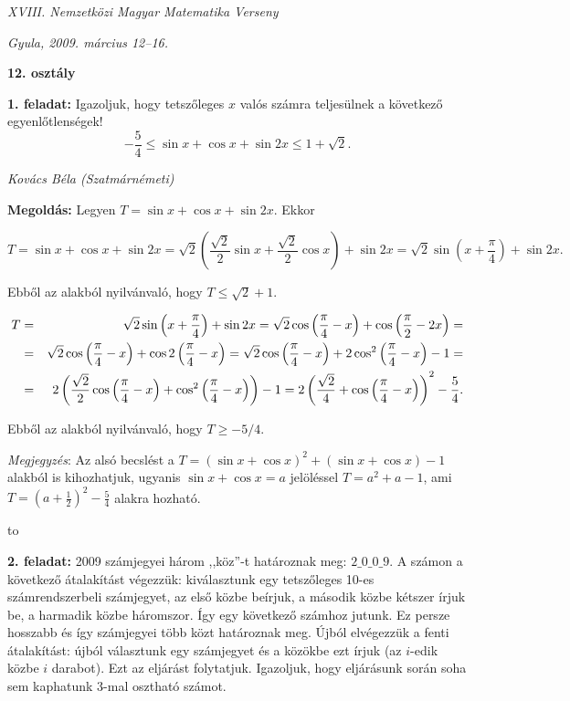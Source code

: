 \documentclass[a4paper,10pt]{article}
\newcommand{\ki}[2]{\hfill {\it #1 (#2)}\medskip}
\newcommand{\vonal}{\hbox to \hsize{\hskip2truecm\hrulefill\hskip2truecm}}
\begin{document}
\begin{center} \Large {\em XVIII. Nemzetközi Magyar Matematika Verseny} \end{center}
\begin{center} \large{\em Gyula, 2009. március 12--16. } \end{center}
\smallskip
\begin{center} \large{\bf 12. osztály} \end{center}
\bigskip 


{\bf 1. feladat:} 
Igazoljuk, hogy tetszőleges $x$ valós számra teljesülnek a következő
egyenlőtlenségek!
$$ -\frac 54\leq \sin{x}+\cos{x}+\sin{2x}\leq 1+\sqrt{2}. $$

\ki{Kovács Béla }{Szatmárnémeti}\medskip

{\bf Megoldás:} Legyen $T = \sin x + \cos x + \sin 2x$. Ekkor

$$
T=\sin x + \cos x +\sin 2x = 
\sqrt 2\left(\frac{\sqrt 2}{2}\sin x+\frac{\sqrt 2}{2}\cos x\right)+\sin 2x =
\sqrt 2 \sin\left(x+\frac{\pi}{4}\right)+\sin 2x.
$$

Ebből az alakból nyilvánvaló, hogy $T \le \sqrt 2 + 1$.

\begin{eqnarray*}
T&=& 
\sqrt 2 \sin\left(x+\frac{\pi}{4}\right)+\sin 2x =
\sqrt 2 \cos\left(\frac{\pi}{4}-x\right)+\cos\left(\frac{\pi}{2}-2x\right)=\cr
&=&
\sqrt 2 \cos\left(\frac{\pi}{4}-x\right)+\cos 2\left(\frac{\pi}{4}-x\right)=
\sqrt 2 \cos\left(\frac{\pi}{4}-x\right)+2\cos^2\left(\frac{\pi}{4}-x\right)-1=\cr
&=&
2\left(\frac{\sqrt 2}{2}\cos\left(\frac{\pi}{4}-x\right)+\cos^2\left(\frac{\pi}{4}-x\right)\right)-1=
2\left(\frac{\sqrt 2}{4}+\cos\left(\frac{\pi}{4}-x\right)\right)^2-\frac{5}{4}.
\end{eqnarray*}


Ebből az alakból nyilvánvaló, hogy $T \ge -5/4$.

\textit{Megjegyzés}: Az alsó becslést a 
$T = \left(\sin x + \cos x\right)^2+\left(\sin x+\cos x\right)-1$ 
alakból is kihozhatjuk,
ugyanis $\sin x + \cos x = a$ jelöléssel 
$T = a^2+a-1$, ami $T = \left(a+\frac{1}{2}\right)^2-\frac{5}{4}$ alakra hozható.


\medskip
\vonal


{\bf 2. feladat:} 
2009 számjegyei három ,,köz''-t határoznak meg: $2\_0\_0\_9$.
A számon a következő átalakítást végezzük: kiválasztunk egy tetszőleges 10-es
számrendszerbeli számjegyet, az első közbe beírjuk, a második közbe kétszer írjuk be, a
harmadik közbe háromszor. Így egy következő számhoz jutunk. Ez persze hosszabb és így
számjegyei több közt határoznak meg. Újból elvégezzük a fenti átalakítást: újból választunk
egy számjegyet és a közökbe ezt írjuk (az $i$-edik közbe $i$ darabot). Ezt az eljárást folytatjuk.
Igazoljuk, hogy eljárásunk során soha sem kaphatunk 3-mal osztható számot.
\end{document}
